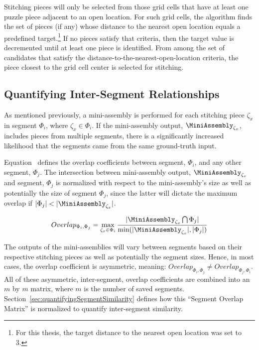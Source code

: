 Stitching pieces will only be selected from those grid cells that have at least one puzzle piece adjacent to an open location. For such grid cells, the algorithm finds the set of pieces (if any) whose distance to the nearest open location equals a predefined target.\footnote{For this thesis, the target distance to the nearest open location was set to 3.}  If no pieces satisfy that criteria, then the target value is decremented until at least one piece is identified. From among the set of candidates that satisfy the distance-to-the-nearest-open-location criteria, the piece closest to the grid cell center is selected for stitching. 

\subsection{Quantifying Inter-Segment Relationships}

As mentioned previously, a mini-assembly is performed for each stitching piece $\zeta_x$ in segment $\Phi_i$, where $\zeta_x \in \Phi_i$.  If the mini-assembly output, $\MiniAssembly_{\zeta_x}$, includes pieces from multiple segments, there is a significantly increased likelihood that the segments came from the same ground-truth input. 

Equation~ defines the overlap coefficients between segment, $\Phi_i$, and any other segment, $\Phi_j$. The intersection between mini-assembly output, $\MiniAssembly_{\zeta_x}$ and segment, $\Phi_j$ is normalized with respect to the mini-assembly's size as well as potentially the size of segment $\Phi_j$, since the latter will dictate the maximum overlap if $|\Phi_j| < |\MiniAssembly_{\zeta_x}|$.  

\begin{equation} \label{eq:segmentOverlap}
  Overlap_{\Phi_i,\Phi_j} = \max\limits_{\zeta_x \in \Phi_i} {\frac{|\MiniAssembly_{\zeta_x} \bigcap \Phi_j|}{\text{min}(|\MiniAssembly_{\zeta_x}|, |\Phi_j|)}}
\end{equation}

The outputs of the mini-assemblies will vary between segments based on their respective stitching pieces as well as potentially the segment sizes.  Hence, in most cases, the overlap coefficient is asymmetric, meaning: $Overlap_{\Phi_i,\Phi_j} \neq Overlap_{\Phi_j,\Phi_i}$.  All of these asymmetric, inter-segment, overlap coefficients are combined into an $m$ by $m$ matrix, where $m$ is the number of saved segments.  Section~\ref{sec:quantifyingSegmentSimilarity} defines how this ``Segment Overlap Matrix'' is normalized to quantify inter-segment similarity.  

